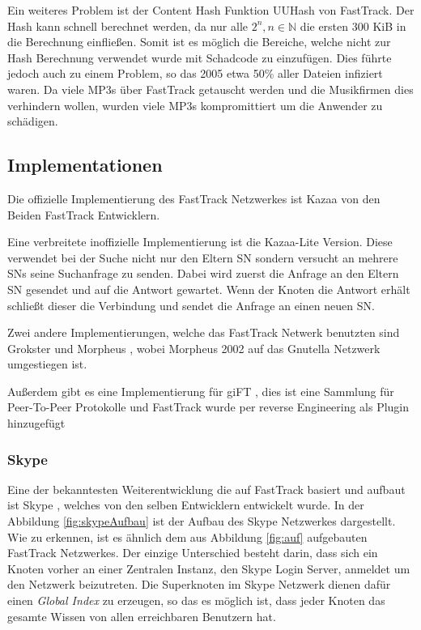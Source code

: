 Ein weiteres Problem ist der Content Hash Funktion UUHash \cite{uuHash} von FastTrack.
Der Hash kann schnell berechnet werden, da nur alle $2^n, n \in \mathbb{N}$ die ersten 300 KiB in die Berechnung einfließen.
Somit ist es möglich die Bereiche, welche nicht zur Hash Berechnung verwendet wurde mit Schadcode zu einzufügen.
Dies führte jedoch auch zu einem Problem, so das 2005 etwa 50\% aller Dateien infiziert waren. \cite{menneck2} 
Da viele MP3s über FastTrack getauscht werden und die Musikfirmen dies verhindern wollen, wurden viele MP3s kompromittiert um die Anwender zu schädigen. \cite{veitinger2002}


\subsection{Implementationen}
\label{subsec:impl}

Die offizielle Implementierung des FastTrack Netzwerkes ist Kazaa \cite{kazaa} von den Beiden FastTrack Entwicklern.

Eine verbreitete inoffizielle Implementierung ist die Kazaa-Lite \cite{kazaaLite} Version.
Diese verwendet bei der Suche nicht nur den Eltern SN sondern versucht an mehrere SNs seine Suchanfrage zu senden.
Dabei wird zuerst die Anfrage an den Eltern SN gesendet und auf die Antwort gewartet.
Wenn der Knoten die Antwort erhält schließt dieser die Verbindung und sendet die Anfrage an einen neuen SN.\cite{liang2006fasttrack}

Zwei andere Implementierungen, welche das FastTrack Netwerk benutzten sind Grokster \cite{grokster} und Morpheus \cite{morpheus}, wobei Morpheus 2002 auf das Gnutella \cite{gnutella} Netzwerk umgestiegen ist. \cite{morphvsKazaa}

Außerdem gibt es eine Implementierung für giFT \cite{gift}, dies ist eine Sammlung für Peer-To-Peer Protokolle und FastTrack wurde per reverse Engineering als Plugin hinzugefügt \cite{liang2006fasttrack}

\subsubsection{Skype}
\label{subsubsec:skype}

Eine der bekanntesten Weiterentwicklung die auf FastTrack basiert und aufbaut ist Skype \cite{skypeAna}, welches von den selben Entwicklern entwickelt wurde.
In der Abbildung \ref{fig:skypeAufbau} ist der Aufbau des Skype Netzwerkes dargestellt.
Wie zu erkennen, ist es ähnlich dem aus Abbildung \ref{fig:auf} aufgebauten FastTrack Netzwerkes.
Der einzige Unterschied besteht darin, dass sich ein Knoten vorher an einer Zentralen Instanz, den Skype Login Server, anmeldet um den Netzwerk beizutreten.
Die Superknoten im Skype Netzwerk dienen dafür einen \textit{Global Index} zu erzeugen, so das es möglich ist, dass jeder Knoten das gesamte Wissen von allen erreichbaren Benutzern hat. \cite{skypep2p}


